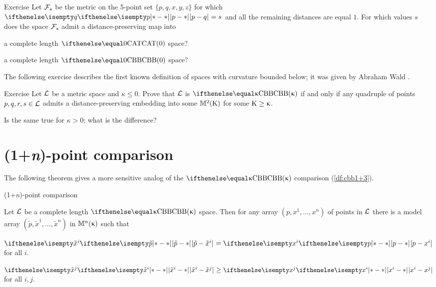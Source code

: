 \begin{thm}{Exercise}\label{ex:5-point-CBA=>CBB}
Let $\mathcal{F}_s$ be the metric
on the 5-point set $\{p,q,x,y,z\}$ for which $\dist{p}{q}{}=s$
and all the remaining distances are equal $1$.
For which values $s$ does the space $\mathcal{F}_s$ admit a distance-preserving map into 
\begin{subthm}{}
a complete length $\CAT{0}$ space?
\end{subthm}
\begin{subthm}{}
a complete length $\Alex{0}$ space?
\end{subthm}
\end{thm}

The following exercise describes the first known definition of spaces with curvature bounded below;
it was given by Abraham Wald \cite{wald}. 

\begin{thm}{Exercise}\label{ex:cbb-wald}
Let $\mathcal{L}$ be a metric space and $\kappa\le 0$.
Prove that $\mathcal{L}$ is $\Alex\kappa$ if and only if any quadruple of points $p,q,r,s\in \spc{L}$ admits a distance-preserving embedding into some $\mathbb{M}_{{}}^{2}({\mathrm{K}})$ for some $\Kappa\ge\kappa$.

Is the same true for $\kappa>0$; what is the difference?
\end{thm}

\section{(1+\textit{n})-point comparison}\label{sec:1+n}

The following theorem gives a more sensitive analog of the $\Alex\kappa$ comparison (\ref{df:cbb1+3}).

\begin{thm}{(1+\textit{n})-point comparison}
\label{thm:pos-config} {\sloppy 
Let $\mathcal{L}$ be a complete length $\Alex{\kappa}$ space.
Then for any array $(p,x^1,\dots,x^n)$ of points in $\mathcal{L}$ 
there is a model array $(\tilde p,\tilde x^1,\dots,\tilde x^n)$ in $\mathbb{M}_{{}}^{n}({\upkappa})$ such that

}

\begin{subthm}{}
$\dist{\tilde p}{\tilde x^i}{}=\dist{p}{x^i}{}$ for all $i$.
\end{subthm}

\begin{subthm}{}$\dist{\tilde x^i}{\tilde x^j}{}\ge\dist{x^i}{x^j}{}$ for all $i,j$.
\end{subthm}
\end{thm}

